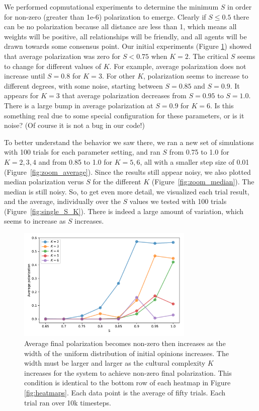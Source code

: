 \documentclass[11pt,letterpaper]{article}
\begin{document}
We performed copmutational experiments to determine the minimum $S$ 
in order for non-zero (greater than 1e-6) polarization to emerge. Clearly if 
$S\leq0.5$ there can be no polarization because all distance are less than 1,
which means all weights will be positive, all
relationships will be friendly, and all agents will be drawn towards some 
consensus point. Our initial experiments (Figure \ref{fig:p_vs_s_for_k})
showed that average polarization was zero for $S < 0.75$ when $K=2$. 
The critical $S$ seems to change for different values of $K$. For example,
average polarization does not increase until $S=0.8$ for $K=3$. For other $K$,
polarization seems to increase to different degrees, with some noise, starting
between $S=0.85$ and $S=0.9$. It appears for $K=3$ that average polarization
decreases from $S=0.95$ to $S=1.0$. There is a large bump in average 
polarization at $S=0.9$ for $K=6$. Is this something real due to some special
configuration for these parameters, or is it noise? (Of course it is not a bug
in our code!)

To better understand the behavior we saw there, we ran a new set of simulations
with 100 trials for each parameter setting, and ran $S$ from 0.75 to 1.0 for
$K=2, 3, 4$ and from 0.85 to 1.0 for $K=5,6$, all with a smaller step size 
of 0.01 (Figure~\ref{fig:zoom_average}). Since the results still appear
noisy, we also plotted median polarization verus $S$ for the different $K$
(Figure~\ref{fig:zoom_median}). The median is still noisy. So, to get even
more detail, we visualized each trial result, and the average, individually
over the $S$ values we tested with 100 trials (Figure~\ref{fig:single_S_K}).
There is indeed a large amount of variation, which seems to increase as $S$
increases.

\begin{figure}[t!]
  \centering
  \includegraphics[width=0.75\textwidth]{Figures/P_vs_S_for_K.pdf}
  \caption{
    Average final polarization becomes non-zero then increases as
    the width of the uniform distribution of initial opinions increases.
    The width must be larger and larger as the cultural complexity $K$ 
    increases for the system to achieve non-zero final polarization. This
    condition is identical to the bottom row of each heatmap in 
    Figure \ref{fig:heatmaps}. Each
    data point is the average of fifty trials. Each trial ran over 
    10k timesteps. 
  }
  \label{fig:p_vs_s_for_k}
\end{figure}
\end{document}
